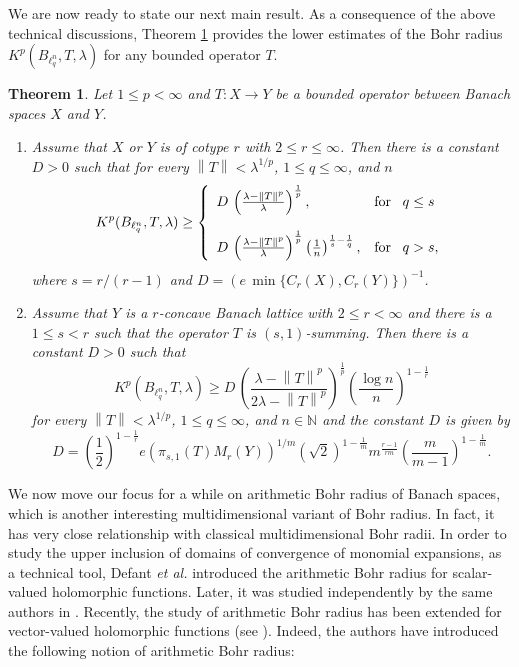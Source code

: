 \documentclass[a4paper,12pt]{amsart}
\newtheorem{thm}{Theorem}[section]
\theoremstyle{definition}
\newcommand{\norm}[1]{\left\lVert#1\right\rVert}
\begin{document}
We are now ready to state our next main result. As a consequence of the above technical discussions, Theorem \ref{Pal-Vasu-P5-thm-03} provides the lower estimates of the Bohr radius $K^p(B_{\ell^n_q},T,\lambda)$ for any bounded operator $T$.
\begin{thm}\label{Pal-Vasu-P5-thm-03}
	Let $1\leq p<\infty$ and $T:X\rightarrow Y$ be a bounded operator between Banach spaces $X$ and $Y$.
	\begin{enumerate}
		\item Assume that $X$ or $Y$ is of cotype $r$ with $2\leq r\leq \infty$. Then there is a constant $D>0$ such that for every $\norm{T}<\lambda^{1/p}$, $1\leq q\leq \infty$, and $n$
		$$
		K^p(B_{\ell^n_q},T, \lambda) \geq \left\{\begin{array}{ll}
			D\, \left(\frac{\lambda - \norm{T}^p}{\lambda}\right)^{\frac{1}{p}}, & \mbox{for \, $q\leq s$}\\[5mm] 
			
			D\, \left(\frac{\lambda - \norm{T}^p}{\lambda}\right)^{\frac{1}{p}} \left(\frac{1}{n}\right)^{\frac{1}{s}-\frac{1}{q}}, & \mbox{for \, $q>s$},
		\end{array}\right.
		$$
		where $s=r/(r-1)$ and $D=(e\, \min\{C_r(X),C_r(Y)\})^{-1}$.\\[2mm]
		\item Assume that $Y$ is a $r$-concave Banach lattice with $2\leq r<\infty$ and there is a $1\leq s<r$ such that the operator $T$ is $(s,1)$-summing. Then there is a constant $D>0$  such that 
		\begin{equation*}
			K^p(B_{\ell^n_q},T, \lambda) \geq D\, \left(\frac{\lambda-\norm{T}^p}{2\lambda -\norm{T}^p}\right)^{\frac{1}{p}} \left(\frac{\log n}{n}\right)^{1-\frac{1}{r}}
		\end{equation*}
	for every $\norm{T}<\lambda^{1/p}$, $1\leq q\leq \infty$, and $n\in \mathbb{N}$ and the constant $D$ is given by
	\begin{equation*}
		D=\left(\frac{1}{2}\right)^{1-\frac{1}{r}}e \left(\pi_{s,1}(T)M_r(Y)\right)^{1/m}(\sqrt{2})^{1-\frac{1}{m}}m^{\frac{r-1}{rm}}\left(\frac{m}{m-1}\right)^{1-\frac{1}{m}}.
	\end{equation*}
	\end{enumerate}
\end{thm}
We now move our focus for a while on arithmetic Bohr radius of Banach spaces, which is another interesting multidimensional variant of Bohr radius. In fact, it has very close relationship with classical multidimensional Bohr radii. In order to study the upper inclusion of domains of convergence of monomial expansions, as a technical tool, Defant {\it et al.} \cite{defant-Domain-J angew-2009} introduced the arithmetic Bohr radius for scalar-valued holomorphic functions. Later, it was studied independently by the same authors in \cite{defant-QJM-2008}. Recently, the study of arithmetic Bohr radius has been extended for vector-valued holomorphic functions (see \cite{Subhadip-Vasu-P3}). Indeed, the authors \cite{Subhadip-Vasu-P3} have introduced the following notion of arithmetic Bohr radius:
\end{document}
